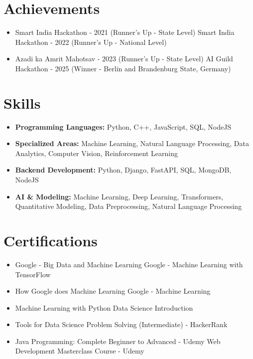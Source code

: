 \documentclass[a4paper,10pt]{article}
\begin{document}
\section*{Achievements}
\begin{itemize}
\item Smart India Hackathon - 2021 (Runner's Up - State Level) \hfill Smart India Hackathon - 2022 (Runner's Up - National Level)
\item Azadi ka Amrit Mahotsav - 2023 (Runner's Up - State Level) \hfill AI Guild Hackathon - 2025 (Winner - Berlin and Brandenburg State, Germany)
\end{itemize}

\section*{Skills}
\begin{itemize}
  \item \textbf{Programming Languages:} Python, C++, JavaScript, SQL, NodeJS
  \item \textbf{Specialized Areas:} Machine Learning, Natural Language Processing, Data Analytics, Computer Vision, Reinforcement Learning
  \item \textbf{Backend Development:} Python, Django, FastAPI, SQL, MongoDB, NodeJS
  \item \textbf{AI \& Modeling:} Machine Learning, Deep Learning, Transformers, Quantitative Modeling, Data Preprocessing, Natural Language Processing
\end{itemize}

\section*{Certifications}
\begin{itemize}
\item Google - Big Data and Machine Learning \hfill Google - Machine Learning with TensorFlow
\item How Google does Machine Learning \hfill Google - Machine Learning
\item Machine Learning with Python \hfill Data Science Introduction
\item Tools for Data Science \hfill Problem Solving (Intermediate) - HackerRank
\item Java Programming: Complete Beginner to Advanced - Udemy \hfill Web Development Masterclass Course - Udemy
\end{itemize}
\end{document}
